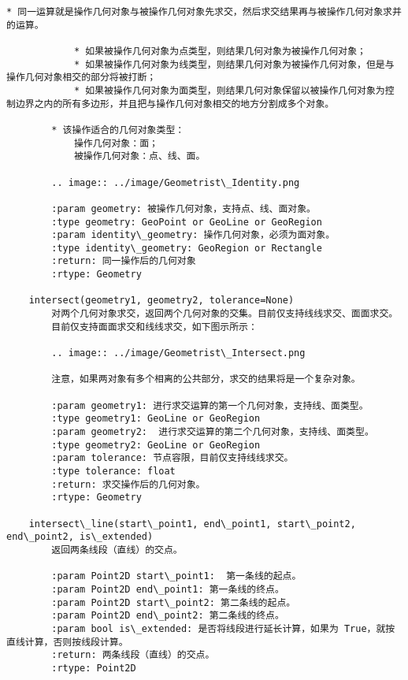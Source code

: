 \documentclass[11pt]{article}
\begin{document}
\begin{Verbatim}[commandchars=\\\{\}]
        * 同一运算就是操作几何对象与被操作几何对象先求交，然后求交结果再与被操作几何对象求并的运算。
        
            * 如果被操作几何对象为点类型，则结果几何对象为被操作几何对象；
            * 如果被操作几何对象为线类型，则结果几何对象为被操作几何对象，但是与操作几何对象相交的部分将被打断；
            * 如果被操作几何对象为面类型，则结果几何对象保留以被操作几何对象为控制边界之内的所有多边形，并且把与操作几何对象相交的地方分割成多个对象。
        
        * 该操作适合的几何对象类型：
            操作几何对象：面；
            被操作几何对象：点、线、面。
        
        .. image:: ../image/Geometrist\_Identity.png
        
        :param geometry: 被操作几何对象，支持点、线、面对象。
        :type geometry: GeoPoint or GeoLine or GeoRegion
        :param identity\_geometry: 操作几何对象，必须为面对象。
        :type identity\_geometry: GeoRegion or Rectangle
        :return: 同一操作后的几何对象
        :rtype: Geometry
    
    intersect(geometry1, geometry2, tolerance=None)
        对两个几何对象求交，返回两个几何对象的交集。目前仅支持线线求交、面面求交。
        目前仅支持面面求交和线线求交，如下图示所示：
        
        .. image:: ../image/Geometrist\_Intersect.png
        
        注意，如果两对象有多个相离的公共部分，求交的结果将是一个复杂对象。
        
        :param geometry1: 进行求交运算的第一个几何对象，支持线、面类型。
        :type geometry1: GeoLine or GeoRegion
        :param geometry2:  进行求交运算的第二个几何对象，支持线、面类型。
        :type geometry2: GeoLine or GeoRegion
        :param tolerance: 节点容限，目前仅支持线线求交。
        :type tolerance: float
        :return: 求交操作后的几何对象。
        :rtype: Geometry
    
    intersect\_line(start\_point1, end\_point1, start\_point2, end\_point2, is\_extended)
        返回两条线段（直线）的交点。
        
        :param Point2D start\_point1:  第一条线的起点。
        :param Point2D end\_point1: 第一条线的终点。
        :param Point2D start\_point2: 第二条线的起点。
        :param Point2D end\_point2: 第二条线的终点。
        :param bool is\_extended: 是否将线段进行延长计算，如果为 True，就按直线计算，否则按线段计算。
        :return: 两条线段（直线）的交点。
        :rtype: Point2D
    

\end{Verbatim}
\end{document}
